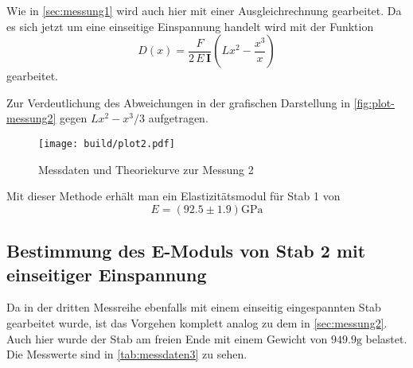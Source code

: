 Wie in \autoref{sec:messung1} wird auch hier mit einer Ausgleichrechnung 
gearbeitet. Da es sich jetzt um eine einseitige Einspannung handelt wird mit der
Funktion
\begin{equation}
	D(x) = \frac{F}{2 \, E \, \mathbf{I}} \left(Lx^2 - \frac{x^3}{x} \right)
\end{equation}
gearbeitet.

Zur Verdeutlichung des Abweichungen in der grafischen Darstellung in
\autoref{fig:plot-messung2} gegen $Lx^2 - x^3/3$ aufgetragen.
\begin{figure}[H]
	\centering
	\texttt{[image: build/plot2.pdf]}
	\caption{Messdaten und Theoriekurve zur Messung 2}
	\label{fig:plot-messung2}
\end{figure}

Mit dieser Methode erhält man ein Elastizitätsmodul für Stab 1 von
\begin{equation}
	E = (92.5 \pm 1.9) \si{\giga\pascal}
	\label{eqn:E-messung2}
\end{equation}

\subsection{Bestimmung des E-Moduls von Stab 2 mit einseitiger Einspannung}
\label{sec:messung3}

Da in der dritten Messreihe ebenfalls mit einem einseitig eingespannten Stab gearbeitet
wurde, ist das Vorgehen komplett analog zu dem in \autoref{sec:messung2}. Auch hier wurde
der Stab am freien Ende mit einem Gewicht von $949.9\si{\gram}$ belastet.
\\
Die Messwerte sind in \autoref{tab:messdaten3} zu sehen.

